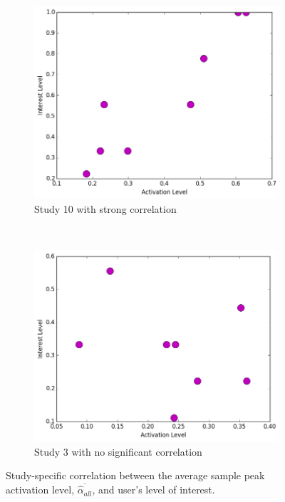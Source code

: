 \begin{figure}[!htb]
	\centering
	\begin{subfigure}[t]{0.45\textwidth}
		\centering
		\includegraphics[width=1.0 \textwidth]{"fig/validations/study_10 - correlation total activation"}
		\caption[Study 10]{Study 10 with strong correlation}
		\label{fig:correlation-study10}
	\end{subfigure}
	~ 
	\begin{subfigure}[t]{0.45\textwidth}
		\centering
		\includegraphics[width=1.0 \textwidth]{"fig/validations/study_3 - correlation total activation"}
		\caption[Study 3]{Study 3 with no significant correlation}
		\label{fig:correlation-study3}
	\end{subfigure}
	\caption[Study-specific correlation between activation level and user's level of interest]{Study-specific correlation between the average sample peak activation level, $\overline{\widehat{\alpha}_{all}}$, and user's level of interest.}
	\label{fig:correlation-study-specific}
\end{figure}

